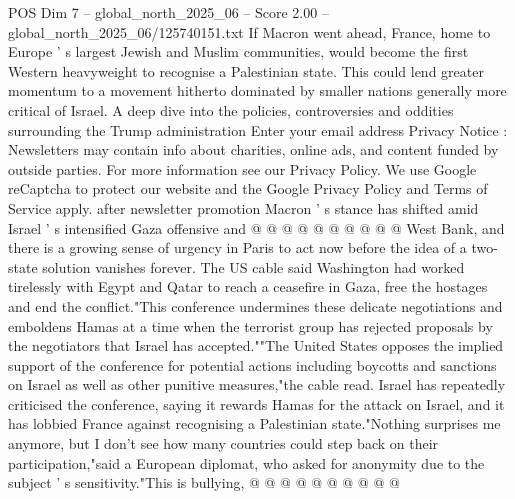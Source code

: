 \begin{textsample}{POS Dim 7 – global\_north\_2025\_06 – Score 2.00 – global\_north\_2025\_06/125740151.txt}
If Macron went ahead, France, home to Europe ' s largest Jewish and Muslim communities, would become the first Western heavyweight to recognise a Palestinian state.
This could lend greater momentum to a movement hitherto dominated by smaller nations generally more critical of Israel.
A deep dive into the policies, controversies and oddities surrounding the Trump administration Enter your email address Privacy Notice : Newsletters may contain info about charities, online ads, and content funded by outside parties.
For more information see our Privacy Policy.
We use Google reCaptcha to protect our website and the Google Privacy Policy and Terms of Service apply. after newsletter promotion Macron ' s stance has shifted amid Israel ' s intensified Gaza offensive and @ @ @ @ @ @ @ @ @ @ West Bank, and there is a growing sense of urgency in Paris to act now before the idea of a two-state solution vanishes forever.
The US cable said Washington had worked tirelessly with Egypt and Qatar to reach a ceasefire in Gaza, free the hostages and end the conflict."This conference undermines these delicate negotiations and emboldens Hamas at a time when the terrorist group has rejected proposals by the negotiators that Israel has accepted.""The United States opposes the implied support of the conference for potential actions including boycotts and sanctions on Israel as well as other punitive measures,"the cable read.
Israel has repeatedly criticised the conference, saying it rewards Hamas for the attack on Israel, and it has lobbied France against recognising a Palestinian state."Nothing surprises me anymore, but I don't see how many countries could step back on their participation,"said a European diplomat, who asked for anonymity due to the subject ' s sensitivity."This is bullying, @ @ @ @ @ @ @ @ @ @

\end{textsample}
